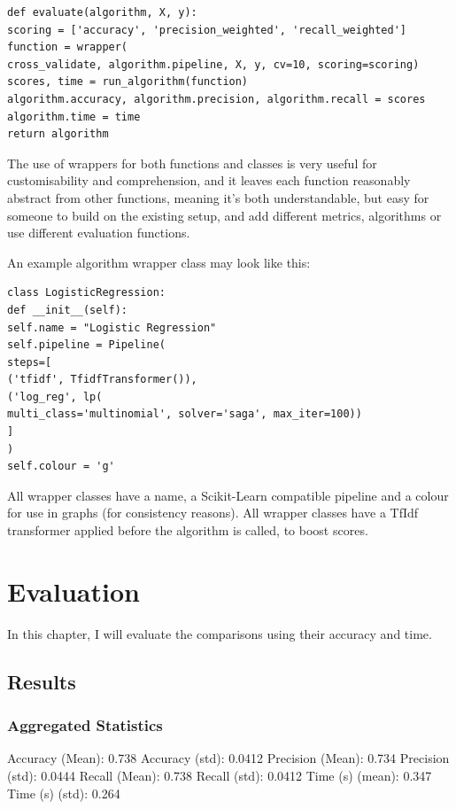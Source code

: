 \documentclass{article}
\begin{document}
\begin{lstlisting}
def evaluate(algorithm, X, y):
scoring = ['accuracy', 'precision_weighted', 'recall_weighted']
function = wrapper(
cross_validate, algorithm.pipeline, X, y, cv=10, scoring=scoring)
scores, time = run_algorithm(function)
algorithm.accuracy, algorithm.precision, algorithm.recall = scores
algorithm.time = time
return algorithm
\end{lstlisting}

The use of wrappers for both functions and classes is very useful for customisability and comprehension, and it leaves each function reasonably abstract from other functions, meaning it's both understandable, but easy for someone to build on the existing setup, and add different metrics, algorithms or use different evaluation functions.

An example algorithm wrapper class may look like this:

\begin{lstlisting}
class LogisticRegression:
def __init__(self):
self.name = "Logistic Regression"
self.pipeline = Pipeline(
steps=[
('tfidf', TfidfTransformer()),
('log_reg', lp(
multi_class='multinomial', solver='saga', max_iter=100))
]
)
self.colour = 'g'
\end{lstlisting}

All wrapper classes have a name, a Scikit-Learn compatible pipeline and a colour for use in graphs (for consistency reasons).
All wrapper classes have a TfIdf transformer applied before the algorithm is called, to boost scores.

\newpage
\section{Evaluation}

In this chapter, I will evaluate the comparisons using their accuracy and time.

\subsection{Results}

\subsubsection{Aggregated Statistics}

Accuracy (Mean): 0.738
Accuracy (std): 0.0412
Precision (Mean): 0.734
Precision (std): 0.0444
Recall (Mean): 0.738
Recall (std): 0.0412
Time (s) (mean): 0.347
Time (s) (std): 0.264
\end{document}
